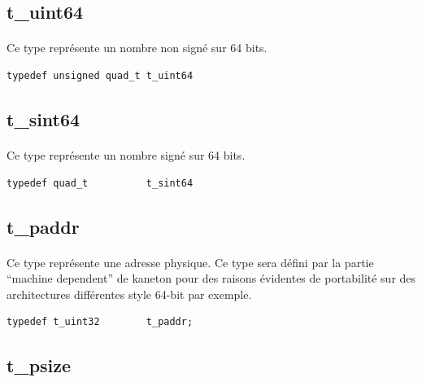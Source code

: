 \documentclass[10pt,a4wide]{article}
\begin{document}
\subsection{t\_uint64}

\paragraph{}

Ce type repr\'esente un nombre non sign\'e sur 64 bits.

\begin{verbatim}
typedef unsigned quad_t t_uint64
\end{verbatim}

\subsection{t\_sint64}

\paragraph{}

Ce type repr\'esente un nombre sign\'e sur 64 bits.

\begin{verbatim}
typedef quad_t          t_sint64
\end{verbatim}

\subsection{t\_paddr}

\paragraph{}

Ce type repr\'esente une adresse physique. Ce type sera d\'efini par la
partie ``machine dependent'' de kaneton pour des raisons \'evidentes de
portabilit\'e sur des architectures diff\'erentes style 64-bit par exemple.

\begin{verbatim}
typedef t_uint32        t_paddr;
\end{verbatim}

\subsection{t\_psize}

\paragraph{}
\end{document}
